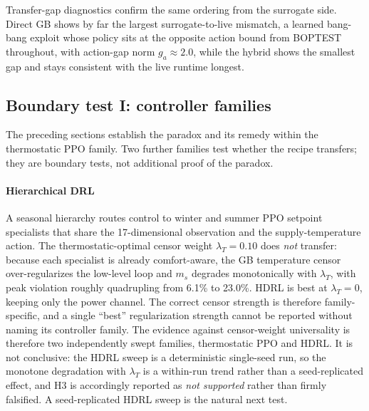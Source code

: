 \documentclass[energies,article,submit,moreauthors]{Definitions/mdpi}
\newcommand{\ms}{\ensuremath{m_s}}
\begin{document}
Transfer-gap diagnostics confirm the same ordering from the surrogate side. Direct GB shows by far
the largest surrogate-to-live mismatch, a learned bang-bang exploit whose policy sits at the
opposite action bound from BOPTEST throughout, with action-gap norm $g_a\approx2.0$, while the
hybrid shows the smallest gap and stays consistent with the live runtime longest.

\subsection{Boundary test I: controller families}\label{sec:families}

The preceding sections establish the paradox and its remedy within the thermostatic PPO family. Two
further families test whether the recipe transfers; they are boundary tests, not additional proof of
the paradox.

\paragraph{Hierarchical DRL}
A seasonal hierarchy routes control to winter and summer PPO setpoint specialists that share the
17-dimensional observation and the supply-temperature action. The thermostatic-optimal censor weight
$\lambda_T=0.10$ does \emph{not} transfer: because each specialist is already comfort-aware, the GB
temperature censor over-regularizes the low-level loop and \ms{} degrades monotonically with
$\lambda_T$, with peak violation roughly quadrupling from 6.1\% to 23.0\%. HDRL is best at
$\lambda_T=0$, keeping only the power channel. The correct censor strength is therefore
family-specific, and a single ``best'' regularization strength cannot be reported without naming its
controller family. The evidence against censor-weight universality is therefore two independently
swept families, thermostatic PPO and HDRL. It is not conclusive: the HDRL sweep is a deterministic
single-seed run, so the monotone degradation with $\lambda_T$ is a within-run trend rather than a
seed-replicated effect, and H3 is accordingly reported as \emph{not supported} rather than firmly
falsified. A seed-replicated HDRL sweep is the natural next test.
\end{document}
